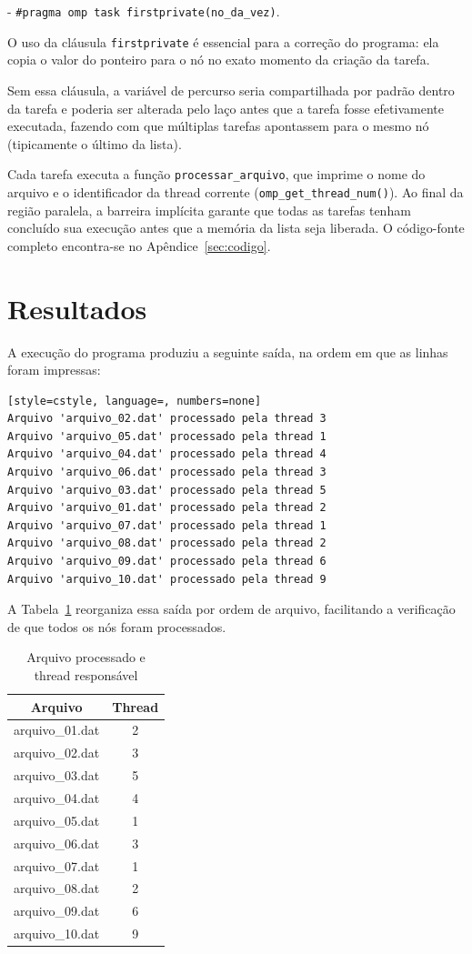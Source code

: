 \documentclass[a4paper,12pt]{article}
\begin{document}
- \texttt{\#pragma omp task firstprivate(no\_da\_vez)}. 

O uso da cláusula \texttt{firstprivate} é essencial para a correção do programa: ela copia o valor do ponteiro para o nó no exato momento da criação da tarefa. 

Sem essa cláusula, a variável de percurso seria compartilhada por padrão dentro da tarefa e poderia ser alterada pelo laço antes que a tarefa fosse efetivamente executada, 
fazendo com que múltiplas tarefas apontassem para o mesmo nó (tipicamente o último da lista).

Cada tarefa executa a função \texttt{processar\_arquivo}, que imprime o nome do arquivo e o 
identificador da thread corrente (\texttt{omp\_get\_thread\_num()}). Ao final da região paralela, 
a barreira implícita garante que todas as tarefas tenham concluído sua execução antes que a memória da lista seja liberada. 
O código-fonte completo encontra-se no Apêndice~\ref{sec:codigo}.

\section{Resultados}

A execução do programa produziu a seguinte saída, na ordem em que as linhas foram impressas:

\begin{lstlisting}[style=cstyle, language=, numbers=none]
Arquivo 'arquivo_02.dat' processado pela thread 3
Arquivo 'arquivo_05.dat' processado pela thread 1
Arquivo 'arquivo_04.dat' processado pela thread 4
Arquivo 'arquivo_06.dat' processado pela thread 3
Arquivo 'arquivo_03.dat' processado pela thread 5
Arquivo 'arquivo_01.dat' processado pela thread 2
Arquivo 'arquivo_07.dat' processado pela thread 1
Arquivo 'arquivo_08.dat' processado pela thread 2
Arquivo 'arquivo_09.dat' processado pela thread 6
Arquivo 'arquivo_10.dat' processado pela thread 9
\end{lstlisting}

A Tabela~\ref{tab:resultados} reorganiza essa saída por ordem de arquivo, facilitando a verificação de que todos os nós foram processados.

\begin{table}[h]
\centering
\caption{Arquivo processado e thread responsável}
\label{tab:resultados}
\begin{tabular}{@{}cc@{}}
\toprule
\textbf{Arquivo} & \textbf{Thread} \\
\midrule
arquivo\_01.dat & 2 \\
arquivo\_02.dat & 3 \\
arquivo\_03.dat & 5 \\
arquivo\_04.dat & 4 \\
arquivo\_05.dat & 1 \\
arquivo\_06.dat & 3 \\
arquivo\_07.dat & 1 \\
arquivo\_08.dat & 2 \\
arquivo\_09.dat & 6 \\
arquivo\_10.dat & 9 \\
\bottomrule
\end{tabular}
\end{table}
\end{document}

